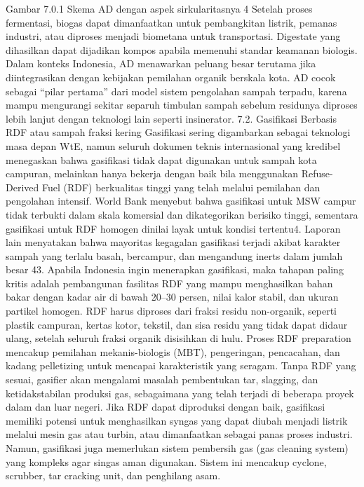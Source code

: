 \documentclass[
  letterpaper,
  DIV=11,
  numbers=noendperiod]{scrreprt}
\begin{document}
Gambar 7.0.1 Skema AD dengan aspek sirkularitasnya 4 Setelah proses
fermentasi, biogas dapat dimanfaatkan untuk pembangkitan listrik,
pemanas industri, atau diproses menjadi biometana untuk transportasi.
Digestate yang dihasilkan dapat dijadikan kompos apabila memenuhi
standar keamanan biologis. Dalam konteks Indonesia, AD menawarkan
peluang besar terutama jika diintegrasikan dengan kebijakan pemilahan
organik berskala kota. AD cocok sebagai ``pilar pertama'' dari model
sistem pengolahan sampah terpadu, karena mampu mengurangi sekitar
separuh timbulan sampah sebelum residunya diproses lebih lanjut dengan
teknologi lain seperti insinerator. 7.2. Gasifikasi Berbasis RDF atau
sampah fraksi kering Gasifikasi sering digambarkan sebagai teknologi
masa depan WtE, namun seluruh dokumen teknis internasional yang kredibel
menegaskan bahwa gasifikasi tidak dapat digunakan untuk sampah kota
campuran, melainkan hanya bekerja dengan baik bila menggunakan
Refuse-Derived Fuel (RDF) berkualitas tinggi yang telah melalui
pemilahan dan pengolahan intensif. World Bank menyebut bahwa gasifikasi
untuk MSW campur tidak terbukti dalam skala komersial dan dikategorikan
berisiko tinggi, sementara gasifikasi untuk RDF homogen dinilai layak
untuk kondisi tertentu4. Laporan lain menyatakan bahwa mayoritas
kegagalan gasifikasi terjadi akibat karakter sampah yang terlalu basah,
bercampur, dan mengandung inerts dalam jumlah besar 43. Apabila
Indonesia ingin menerapkan gasifikasi, maka tahapan paling kritis adalah
pembangunan fasilitas RDF yang mampu menghasilkan bahan bakar dengan
kadar air di bawah 20--30 persen, nilai kalor stabil, dan ukuran
partikel homogen. RDF harus diproses dari fraksi residu non-organik,
seperti plastik campuran, kertas kotor, tekstil, dan sisa residu yang
tidak dapat didaur ulang, setelah seluruh fraksi organik disisihkan di
hulu. Proses RDF preparation mencakup pemilahan mekanis-biologis (MBT),
pengeringan, pencacahan, dan kadang pelletizing untuk mencapai
karakteristik yang seragam. Tanpa RDF yang sesuai, gasifier akan
mengalami masalah pembentukan tar, slagging, dan ketidakstabilan
produksi gas, sebagaimana yang telah terjadi di beberapa proyek dalam
dan luar negeri. Jika RDF dapat diproduksi dengan baik, gasifikasi
memiliki potensi untuk menghasilkan syngas yang dapat diubah menjadi
listrik melalui mesin gas atau turbin, atau dimanfaatkan sebagai panas
proses industri. Namun, gasifikasi juga memerlukan sistem pembersih gas
(gas cleaning system) yang kompleks agar singas aman digunakan. Sistem
ini mencakup cyclone, scrubber, tar cracking unit, dan penghilang asam.
\end{document}
